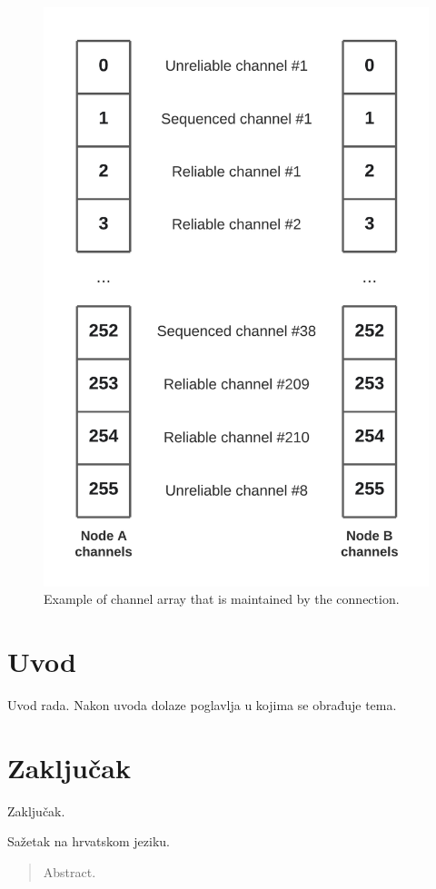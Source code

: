 \documentclass[times, utf8, diplomski]{fer}
\begin{document}
\begin{figure}[H]
	\centering
	\includegraphics[scale=0.2]{Connection-channels}
	\caption{Example of channel array that is maintained by the connection.}
\end{figure}



\chapter{Uvod}
Uvod rada. Nakon uvoda dolaze poglavlja u kojima se obrađuje tema.

\chapter{Zaključak}
Zaključak.




\begin{sazetak}
Sažetak na hrvatskom jeziku.

\end{sazetak}

\begin{abstract}
Abstract.

\end{abstract}
\end{document}
